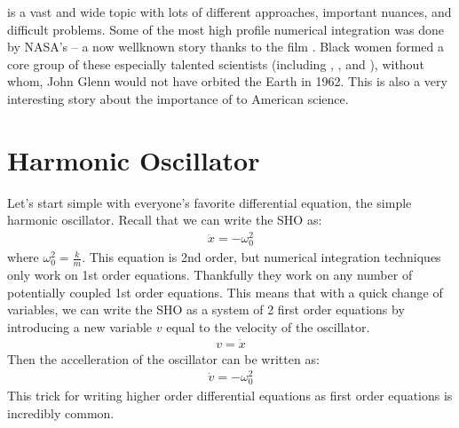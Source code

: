 \documentclass[letterpaper,10pt,english]{jupyterBook}
\begin{document}
\sphinxAtStartPar
{} is a vast and wide topic with lots of different approaches, important nuances, and difficult problems. Some of the most high profile numerical integration was done by NASA’s  – a now well\sphinxhyphen{}known story thanks to the film . Black women formed a core group of these especially talented scientists (including , , and ), without whom, John Glenn would not have orbited the Earth in 1962. This is also a very interesting story about the importance of  to American science.


\section{Harmonic Oscillator}
\label{\detokenize{content/1_mechanics/lagrange_2:harmonic-oscillator}}
\sphinxAtStartPar
Let’s start simple with everyone’s favorite differential equation, the simple harmonic oscillator. Recall that we can write the SHO as:
\begin{equation*}
\begin{split}
\ddot{x} =  -\omega_0^2
\end{split}
\end{equation*}
\sphinxAtStartPar
where \(\omega_0^2 = \frac{k}{m}\). This equation is 2nd order, but numerical integration techniques only work on 1st order equations. Thankfully they work on any number of potentially coupled 1st order equations. This means that with a quick change of variables, we can write the SHO as a system of 2 first order equations by introducing a new variable \(v\) equal to the velocity of the oscillator.
\begin{equation*}
\begin{split}
v = \dot{x}
\end{split}
\end{equation*}
\sphinxAtStartPar
Then the accelleration of the oscillator can be written as:
\begin{equation*}
\begin{split}
\dot{v}  = -\omega_0^2
\end{split}
\end{equation*}
\sphinxAtStartPar
This trick for writing higher order differential equations as first order equations is incredibly common.
\end{document}
